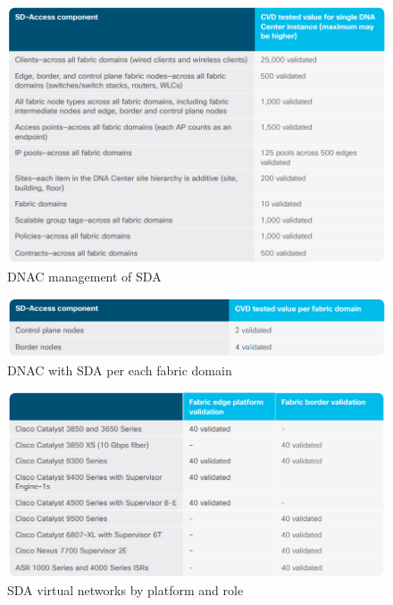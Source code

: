 \begin{figure}[H]
	\centering
	\includegraphics[width=1\linewidth]{img/Analyse/CVD-DNACmanagementofSDA}
	\caption{DNAC management of SDA \cite{sda-designguide} }
	\label{fig:DNAC management of SDA}
\end{figure}

\begin{figure}[H]
	\centering
	\includegraphics[width=1\linewidth]{img/Analyse/CVD-DNACwithSDAperFabricDomain}
	\caption{DNAC with SDA per each fabric domain \cite{sda-designguide} }
	\label{fig:DNAC with SDA per each fabric domain}
\end{figure}

\begin{figure}[H]
	\centering
	\includegraphics[width=1\linewidth]{img/Analyse/CVD-SDAvirtualnetworksbyplatformandrole}
	\caption{SDA virtual networks by platform and role \cite{sda-designguide} }
	\label{fig:SDA virtual networks by platform and role}
\end{figure}


